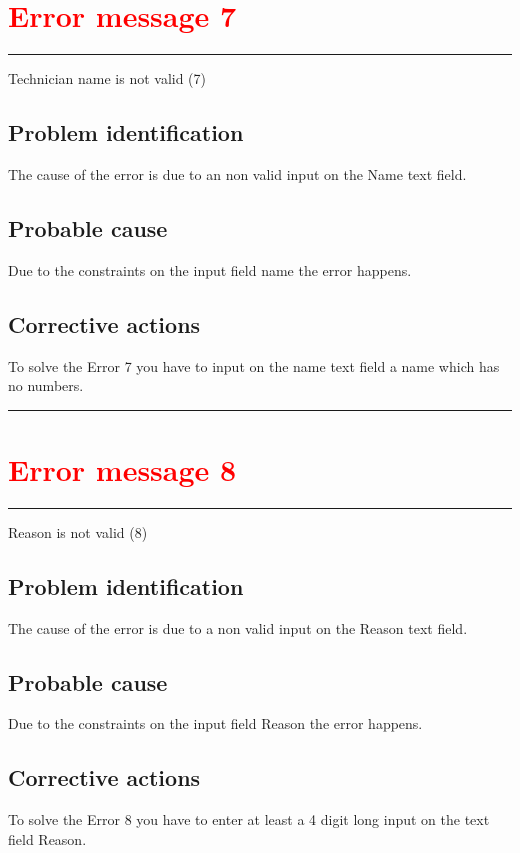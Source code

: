 \section{\textbf{\textcolor{red}{Error message 7}}}
\hrule
\vspace{0.5cm}
Technician name is not valid (7)

\subsection{Problem identification}
The cause of the error is due to an non valid input on the Name text field.

\subsection{Probable cause}
Due to the constraints on the input field name the error happens.

\subsection{Corrective actions}
To solve the Error 7 you have to input on the name text field a name which has
no numbers.

\vspace{0.5cm}
\hrule
\break

\section{\textbf{\textcolor{red}{Error message 8}}}
\hrule
\vspace{0.5cm}
Reason is not valid (8)
\subsection{Problem identification}
The cause of the error is due to a non valid input on the Reason text field.

\subsection{Probable cause}
Due to the constraints on the input field Reason the error happens.

\subsection{Corrective actions}
To solve the Error 8 you have to enter at least a 4 digit long input on the text
field Reason.

